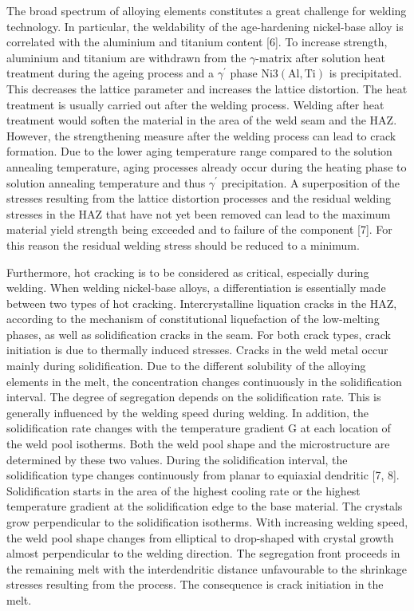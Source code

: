\documentclass[10pt]{article}
\begin{document}
The broad spectrum of alloying elements constitutes a great challenge for welding technology. In particular, the weldability of the age-hardening nickel-base alloy is correlated with the aluminium and titanium content [6]. To increase strength, aluminium and titanium are withdrawn from the $\gamma$-matrix after solution heat treatment during the ageing process and a $\gamma^{\prime}$ phase $\mathrm{Ni} 3(\mathrm{Al}, \mathrm{Ti})$ is precipitated. This decreases the lattice parameter and increases the lattice distortion. The heat treatment is usually carried out after the welding process. Welding after heat treatment would soften the material in the area of the weld seam and the HAZ. However, the strengthening measure after the welding process can lead to crack formation. Due to the lower aging temperature range compared to the solution annealing temperature, aging processes already occur during the heating phase to solution annealing temperature and thus $\gamma^{\prime}$ precipitation. A superposition of the stresses resulting from the lattice distortion processes and the residual welding stresses in the HAZ that have not yet been removed can lead to the maximum material yield strength being exceeded and to failure of the component [7]. For this reason the residual welding stress should be reduced to a minimum.

Furthermore, hot cracking is to be considered as critical, especially during welding. When welding nickel-base alloys, a differentiation is essentially made between two types of hot cracking. Intercrystalline liquation cracks in the HAZ, according to the mechanism of constitutional liquefaction of the low-melting phases, as well as solidification cracks in the seam. For both crack types, crack initiation is due to thermally induced stresses. Cracks in the weld metal occur mainly during solidification. Due to the different solubility of the alloying elements in the melt, the concentration changes continuously in the solidification interval. The degree of segregation depends on the solidification rate. This is generally influenced by the welding speed during welding. In addition, the solidification rate changes with the temperature gradient $\mathrm{G}$ at each location of the weld pool isotherms. Both the weld pool shape and the microstructure are determined by these two values. During the solidification interval, the solidification type changes continuously from planar to equiaxial dendritic [7, 8]. Solidification starts in the area of the highest cooling rate or the highest temperature gradient at the solidification edge to the base material. The crystals grow perpendicular to the solidification isotherms. With increasing welding speed, the weld pool shape changes from elliptical to drop-shaped with crystal growth almost perpendicular to the welding direction. The segregation front proceeds in the remaining melt with the interdendritic distance unfavourable to the shrinkage stresses resulting from the process. The consequence is crack initiation in the melt.
\end{document}
